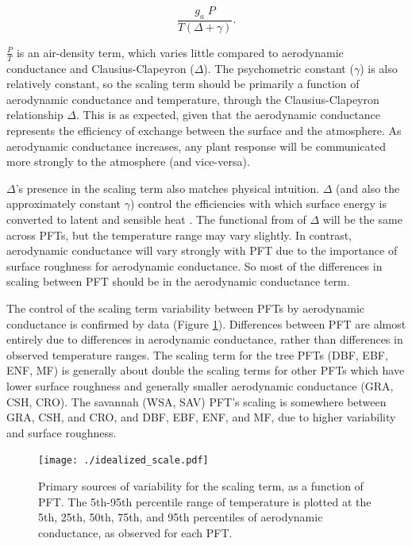 \begin{equation}
  \frac{g_a \; P}{T(\Delta + \gamma)}.
\end{equation}

$\frac{P}{T}$ is an air-density term, which varies little compared to
aerodynamic conductance and Clausius-Clapeyron ($\Delta$). The
psychometric constant ($\gamma$) is also relatively constant, so the
scaling term should be primarily a function of aerodynamic conductance
and temperature, through the Clausius-Clapeyron relationship
$\Delta$. This is as expected, given that the aerodynamic conductance
represents the efficiency of exchange between the surface and the
atmosphere. As aerodynamic conductance increases, any plant response
will be communicated more strongly to the atmosphere (and vice-versa).

$\Delta$'s presence in the scaling term also matches physical
intuition. $\Delta$ (and also the approximately constant $\gamma$)
control the efficiencies with which surface energy is converted to
latent and sensible heat \citep{Monteith_1965}. The functional from of
$\Delta$ will be the same across PFTs, but the temperature range may
vary slightly. In contrast, aerodynamic conductance will vary strongly
with PFT due to the importance of surface roughness for aerodynamic
conductance. So most of the differences in scaling between PFT should
be in the aerodynamic conductance term.

The control of the scaling term variability between PFTs by
aerodynamic conductance is confirmed by data (Figure
\ref{scale_vary}). Differences between PFT are almost entirely due to
differences in aerodynamic conductance, rather than differences in
observed temperature ranges. The scaling term for the tree PFTs (DBF,
EBF, ENF, MF) is generally about double the scaling terms for other
PFTs which have lower surface roughness and generally smaller
aerodynamic conductance (GRA, CSH, CRO). The savannah (WSA, SAV) PFT's
scaling is somewhere between GRA, CSH, and CRO, and DBF, EBF, ENF, and
MF, due to higher variability and surface roughness.

\begin{figure}
  \centerline{\texttt{[image: ./idealized\_scale.pdf]}}
  \caption{Primary sources of variability for the scaling term, as a
    function of PFT. The 5th-95th percentile range of temperature is
    plotted at the 5th, 25th, 50th, 75th, and 95th percentiles of
    aerodynamic conductance, as observed for each PFT.}
  \label{scale_vary}
\end{figure}

